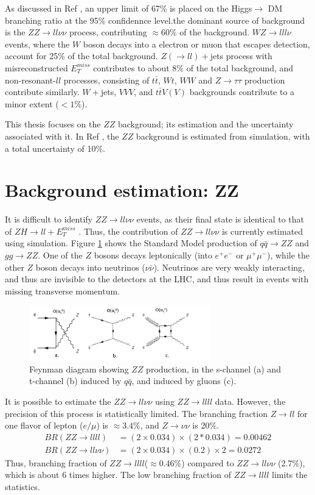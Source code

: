 \documentclass[11pt,a4paper,openright,twoside]{report}
\newcommand{\ZZ}{$ZZ\to ll\nu\nu$ }
\newcommand{\met}{$E_T^{miss}$ }
\begin{document}
As discussed in Ref \cite{ZH_ATLAS}, an upper limit of 67\% is placed on the Higgs$\to$ DM branching ratio at the 95\% confidennce level.the dominant source of background is the \ZZ process, contributing $\approx 60\%$ of the background. $WZ\to lll\nu$ events, where the $W$ boson decays into a electron or muon that escapes detection, account for 25\% of the total background. $Z(\to ll)+$jets process with misreconstructed \met contributes to about 8\% of the total background, and non-resonant-$ll$ processes, consisting of $t\bar{t}$, $Wt$, $WW$ and $Z\to\tau\tau$ production contribute similarly. $W+$jets, $VVV$, and $t\bar{t}V(V)$ backgrounds contribute to a minor extent ($<1\%$).

This thesis focuses on the $ZZ$ background; its estimation and the uncertainty associated with it. In Ref \cite{ZH_ATLAS}, the $ZZ$ background is estimated from simulation, with a total uncertainty of 10\%.

\section{Background estimation: ZZ}
It is difficult to identify \ZZ events, as their final state is identical to that of $ZH\to ll+$\met. Thus, the contribution of \ZZ is currently estimated using simulation. Figure \ref{fig:ZZ} shows the Standard Model production of $q\bar{q}\to ZZ$ and $gg\to ZZ$. One of the $Z$ bosons decays leptonically (into $e^+e^-$ or $\mu^+\mu^-$), while the other $Z$ boson decays into neutrinos ($\nu\bar{\nu}$). Neutrinos are very weakly interacting, and thus are invisible to the detectors at the LHC, and thus result in events with missing transverse momentum.

\begin{figure}[H]
\centering
		\includegraphics[width=0.7\textwidth]{ZZ.png}
		\caption{Feynman diagram showing $ZZ$ production, in the s-channel (a) and t-channel (b) induced by $q\bar{q}$, and induced by gluons (c).}
		\label{fig:ZZ}
\end{figure}

It is possible to estimate the \ZZ using $ZZ\to llll$ data. However, the precision of this process is statistically limited. The branching fraction $Z\to ll$ for one flavor of lepton ($e/\mu$) is $\approx 3.4\%$, and $Z\to\nu\nu$ is 20\%. 
\begin{align}
BR(ZZ\to llll) &= (2\times 0.034)\times(2*0.034) = 0.00462\\
BR(ZZ\to ll\nu\nu) &= (2\times 0.034)\times(0.2)\times 2 = 0.0272
\end{align}
Thus, branching fraction of $ZZ\to llll$($\approx$0.46\%) compared to \ZZ (2.7\%), which is about 6 times higher. The low branching fraction of $ZZ\to llll$ limits the statistics.
\end{document}
